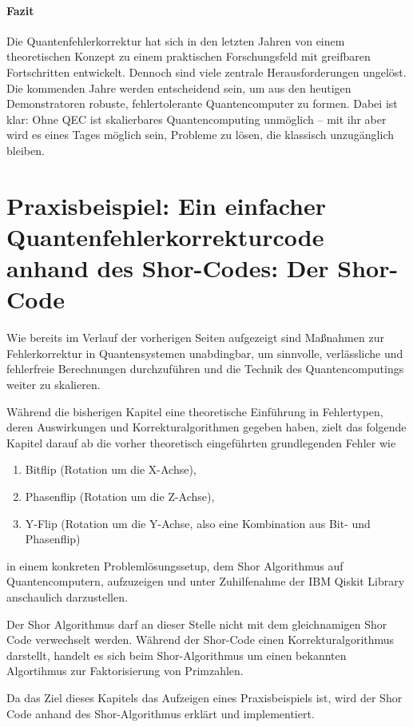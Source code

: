 \paragraph{Fazit} 
Die Quantenfehlerkorrektur hat sich in den letzten Jahren von einem theoretischen Konzept zu einem praktischen Forschungsfeld mit greifbaren Fortschritten entwickelt. Dennoch sind viele zentrale Herausforderungen ungel\"ost. Die kommenden Jahre werden entscheidend sein, um aus den heutigen Demonstratoren robuste, fehlertolerante Quantencomputer zu formen. Dabei ist klar: Ohne QEC ist skalierbares Quantencomputing unm\"oglich -- mit ihr aber wird es eines Tages m\"oglich sein, Probleme zu l\"osen, die klassisch unzug\"anglich bleiben.

\section{Praxisbeispiel: Ein einfacher Quantenfehlerkorrekturcode anhand des Shor-Codes: Der Shor-Code}
Wie bereits im Verlauf der vorherigen Seiten aufgezeigt sind Maßnahmen zur Fehlerkorrektur in Quantensystemen unabdingbar, um sinnvolle, verlässliche und fehlerfreie Berechnungen durchzuführen und die Technik des Quantencomputings weiter zu skalieren.

Während die bisherigen Kapitel eine theoretische Einführung in Fehlertypen, deren Auswirkungen und Korrekturalgorithmen gegeben haben, zielt das folgende Kapitel darauf ab die vorher theoretisch eingeführten grundlegenden Fehler wie 
\begin{enumerate}
    \item Bitflip (Rotation um die X-Achse),
    \item Phasenflip (Rotation um die Z-Achse),
    \item Y-Flip (Rotation um die Y-Achse, also eine Kombination aus Bit- und Phasenflip)
\end{enumerate}
in einem konkreten Problemlösungssetup, dem Shor Algorithmus auf Quantencomputern, aufzuzeigen und unter Zuhilfenahme der IBM Qiskit Library anschaulich darzustellen.

Der Shor Algorithmus darf an dieser Stelle nicht mit dem gleichnamigen Shor Code verwechselt werden. Während der Shor-Code einen Korrekturalgorithmus darstellt, handelt es sich beim Shor-Algorithmus um einen bekannten Algortihmus zur Faktorisierung von Primzahlen.

Da das Ziel dieses Kapitels das Aufzeigen eines Praxisbeispiels ist, wird der Shor Code anhand des Shor-Algorithmus erklärt und implementiert.

